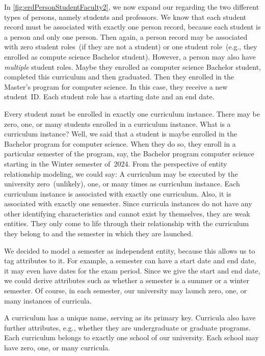 In \cref{fig:erdPersonStudentFaculty2}, we now expand our  regarding the two different types of persons, namely students and professors.
We know that each student record must be associated with exactly one person record, because each student is a person and only one person.
Then again, a person record may be associated with zero student roles~(if they are not a student) or one student role~(e.g., they enrolled as compute science Bachelor student).
However, a person may also have \emph{multiple} student roles.
Maybe they enrolled as computer science Bachelor student, completed this curriculum and then graduated.
Then they enrolled in the Master's program for computer science.
In this case, they receive a new student~ID.
Each student role has a starting date and an end date.

Every student must be enrolled in exactly one curriculum instance.
There may be zero, one, or many students enrolled in a curriculum instance.
What is a curriculum instance?
Well, we said that a student is maybe enrolled in the Bachelor program for computer science.
When they do so, they enroll in a particular semester of the program, say, the Bachelor program computer science starting in the Winter semester of~2024.
From the perspective of entity relationship modeling, we could say:
A curriculum may be executed by the university zero~(unlikely), one, or many times as curriculum instance.
Each curriculum instance is associated with exactly one curriculum.
Also, it is associated with exactly one semester.
Since curricula instances do not have any other identifying characteristics and cannot exist by themselves, they are weak entities.
They only come to life through their relationship with the curriculum they belong to and the semester in which they are launched.

We decided to model a semester as independent entity, because this allows us to tag attributes to it.
For example, a semester can have a start date and end date, it may even have dates for the exam period.
Since we give the start and end date, we could derive attributes such as whether a semester is a summer or a winter semester.
Of course, in each semester, our university may launch zero, one, or many instances of curricula.

A curriculum has a unique name, serving as its primary key.
Curricula also have further attributes, e.g., whether they are undergraduate or graduate programs.
Each curriculum belongs to exactly one school of our university.
Each school may have zero, one, or many curricula.


